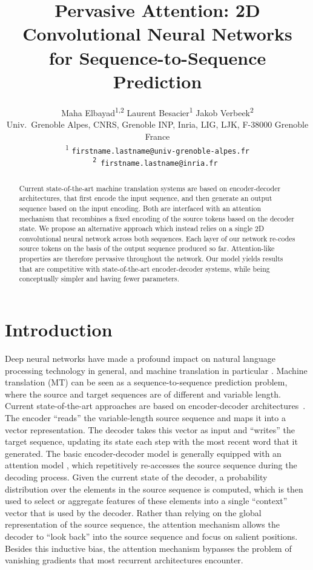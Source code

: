 \documentclass[11pt,a4paper]{article}
\title{Pervasive Attention: 2D Convolutional Neural Networks\\
for Sequence-to-Sequence Prediction}
\author{Maha Elbayad\textsuperscript{1,2} \hspace{20pt}
        Laurent Besacier\textsuperscript{1} \hspace{20pt}
        Jakob Verbeek\textsuperscript{2} \\
        Univ.\ Grenoble Alpes, CNRS, Grenoble INP, Inria, LIG, LJK, F-38000 Grenoble France\\
        \textsuperscript{1} \tt{firstname.lastname@univ-grenoble-alpes.fr}\\
        \textsuperscript{2} \tt{firstname.lastname@inria.fr}
         }
\date{}
\begin{document}
\maketitle


\begin{abstract}
Current state-of-the-art machine translation systems are based on encoder-decoder architectures, that first encode the input sequence, and then generate an output sequence based on the input encoding. Both are interfaced with an attention mechanism that recombines a fixed encoding of the source tokens based on the decoder state. We propose an alternative approach which instead relies on a single 2D convolutional neural network across both sequences. Each layer of our network re-codes source tokens on the basis of the output sequence produced so far. Attention-like properties are therefore pervasive throughout the network. Our model yields results that are competitive with state-of-the-art encoder-decoder systems, while being conceptually simpler and having fewer parameters.
\end{abstract} 
\section{Introduction}
\label{sec:intro}
Deep neural networks have made a profound impact on natural language processing technology in general, and machine translation in particular \cite{kalchbrenner13acl,sutskever14nips,cho14emnlp,jean15acl,lecun15nature}.  
Machine translation (MT) can be seen as a sequence-to-sequence prediction problem, where the source and target sequences are of different and variable length.
Current state-of-the-art approaches are based on encoder-decoder architectures~\cite{kalchbrenner13acl,sutskever14nips,cho14emnlp,bahdanau15iclr}.  
The encoder ``reads'' the variable-length source sequence and maps it into a vector representation.  The decoder
takes this vector as input and ``writes'' the target sequence,
updating 
its state each step with the most recent word that it generated.
The basic encoder-decoder model is generally equipped with an attention model \cite{bahdanau15iclr}, which repetitively re-accesses the source sequence during the decoding process.
Given the current state of the decoder, a probability distribution over the elements in the source sequence is computed, which is then used to select or aggregate features of these elements into a single ``context'' vector that is used by the decoder.
Rather than relying on the global representation of the source sequence, the attention mechanism allows the decoder to ``look back'' into the source sequence and focus on salient positions. Besides this inductive bias, the attention mechanism bypasses the problem of vanishing gradients that most recurrent architectures encounter.
\end{document}
